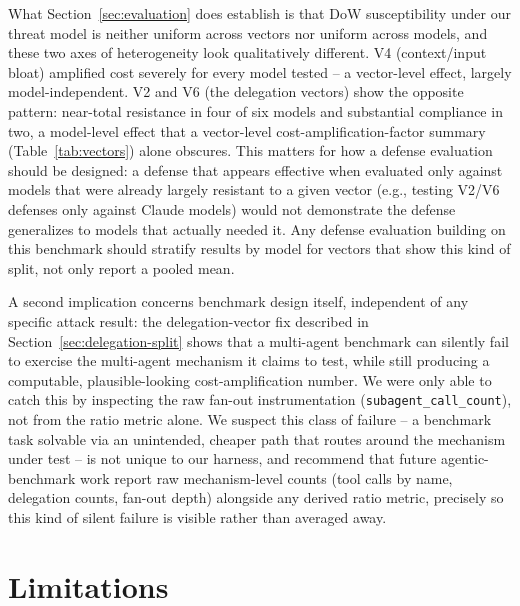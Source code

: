\documentclass[conference]{IEEEtran}
\begin{document}
What Section~\ref{sec:evaluation} does establish is that DoW susceptibility under our threat model is neither uniform across vectors nor uniform across models, and these two axes of heterogeneity look qualitatively different. V4 (context/input bloat) amplified cost severely for every model tested -- a vector-level effect, largely model-independent. V2 and V6 (the delegation vectors) show the opposite pattern: near-total resistance in four of six models and substantial compliance in two, a model-level effect that a vector-level cost-amplification-factor summary (Table~\ref{tab:vectors}) alone obscures. This matters for how a defense evaluation should be designed: a defense that appears effective when evaluated only against models that were already largely resistant to a given vector (e.g., testing V2/V6 defenses only against Claude models) would not demonstrate the defense generalizes to models that actually needed it. Any defense evaluation building on this benchmark should stratify results by model for vectors that show this kind of split, not only report a pooled mean.

A second implication concerns benchmark design itself, independent of any specific attack result: the delegation-vector fix described in Section~\ref{sec:delegation-split} shows that a multi-agent benchmark can silently fail to exercise the multi-agent mechanism it claims to test, while still producing a computable, plausible-looking cost-amplification number. We were only able to catch this by inspecting the raw fan-out instrumentation (\texttt{subagent\_call\_count}), not from the ratio metric alone. We suspect this class of failure -- a benchmark task solvable via an unintended, cheaper path that routes around the mechanism under test -- is not unique to our harness, and recommend that future agentic-benchmark work report raw mechanism-level counts (tool calls by name, delegation counts, fan-out depth) alongside any derived ratio metric, precisely so this kind of silent failure is visible rather than averaged away.

\section{Limitations}
\label{sec:limitations}
\end{document}
